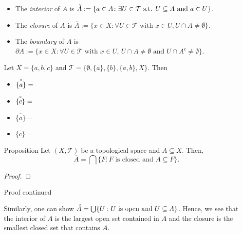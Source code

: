 \documentclass [aspectratio=169]{beamer}
\newcommand{\cT}{\mathcal{T}}
\newcommand{\interior}{\accentset{\circ}}
\begin{document}
\begin{frame}
\small
\begin{itemize}
    \item The \emph{interior} of $A$ is $\interior A := \{a \in A \colon \exists U \in  \cT \text{ s.t. } U\subseteq A \text{ and } a\in U\} $.
    \item The \emph{closure} of $A$ is $\overline{A} := \{x \in X \colon \forall U \in \cT \text{ with } x \in U, U\cap A \neq \emptyset\}$.
    \item The \emph{boundary} of $A$ is $\partial A:= \{x \in X \colon \forall U\in \cT \text{ with } x\in U, \, U \cap A \neq \emptyset \text{ and } U \cap A^c \neq \emptyset \}$.
\end{itemize}
\normalsize

\vspace{0.5em}

\begin{example}
Let $X=\{a,b,c\}$ and $\cT = \{\emptyset ,\{a\}, \{b\},\{a,b\}, X\}$. Then 
\begin{itemize}
	\setlength\itemsep{0.5em}
    \item $ \interior{\{ a\} } =$
    \item $\interior{ \{c\}} =$
    \item $\overline{\{a\}}=$
    \item $\overline{\{c\}} =$
\end{itemize}
\vspace{2em}
\end{example}
\end{frame}

\begin{frame}
\begin{exampleblock}{Proposition}
 Let $(X,\cT)$ be a topological space and $A\subseteq X$. Then,
 \begin{equation*}
     \overline{A} = \bigcap \{F \colon F \text{ is closed and } A \subseteq F\}.
 \end{equation*}
\end{exampleblock}
\begin{proof}
\vspace{3cm}
\end{proof}
\end{frame}


\begin{frame}
\begin{block}{Proof continued}
\vspace{4.5cm}
\end{block}
Similarly, one can show $\interior A =\bigcup \{U: U \text{ is open and } U \subseteq A \}$. Hence, we see that the interior of $A$ is the largest open set contained in $A$ and the closure is the smallest closed set that contains $A$.

\end{frame}
\end{document}
